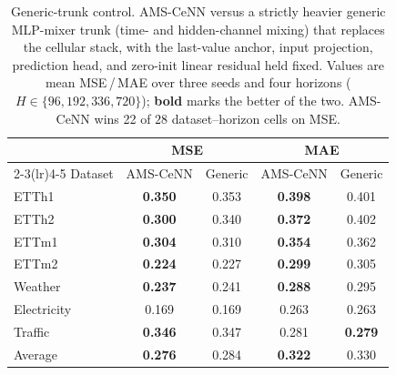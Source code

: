 \begin{table}[t]
\centering
\caption{Generic-trunk control. AMS-CeNN versus a strictly heavier generic MLP-mixer trunk (time- and hidden-channel mixing) that replaces the cellular stack, with the last-value anchor, input projection, prediction head, and zero-init linear residual held fixed. Values are mean MSE\,/\,MAE over three seeds and four horizons ($H \in \{96,192,336,720\}$); \textbf{bold} marks the better of the two. AMS-CeNN wins 22 of $28$ dataset--horizon cells on MSE.}
\label{tab:generic_trunk}
\begin{tabular}{l cc cc}
\toprule
& \multicolumn{2}{c}{MSE} & \multicolumn{2}{c}{MAE} \\
\cmidrule(lr){2-3}\cmidrule(lr){4-5}
Dataset & AMS-CeNN & Generic & AMS-CeNN & Generic \\
\midrule
ETTh1 & \textbf{0.350} & 0.353 & \textbf{0.398} & 0.401 \\
ETTh2 & \textbf{0.300} & 0.340 & \textbf{0.372} & 0.402 \\
ETTm1 & \textbf{0.304} & 0.310 & \textbf{0.354} & 0.362 \\
ETTm2 & \textbf{0.224} & 0.227 & \textbf{0.299} & 0.305 \\
Weather & \textbf{0.237} & 0.241 & \textbf{0.288} & 0.295 \\
Electricity & 0.169 & 0.169 & 0.263 & 0.263 \\
Traffic & \textbf{0.346} & 0.347 & 0.281 & \textbf{0.279} \\
\midrule
Average & \textbf{0.276} & 0.284 & \textbf{0.322} & 0.330 \\
\bottomrule
\end{tabular}
\end{table}
